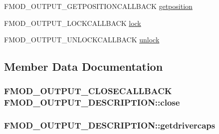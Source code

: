 \begin{DoxyCompactItemize}
\item 
F\-M\-O\-D\-\_\-\-O\-U\-T\-P\-U\-T\-\_\-\-G\-E\-T\-P\-O\-S\-I\-T\-I\-O\-N\-C\-A\-L\-L\-B\-A\-C\-K \hyperlink{struct_f_m_o_d___o_u_t_p_u_t___d_e_s_c_r_i_p_t_i_o_n_ae8b8332e832ea9d12c45a48dd0481e9e}{getposition}
\item 
F\-M\-O\-D\-\_\-\-O\-U\-T\-P\-U\-T\-\_\-\-L\-O\-C\-K\-C\-A\-L\-L\-B\-A\-C\-K \hyperlink{struct_f_m_o_d___o_u_t_p_u_t___d_e_s_c_r_i_p_t_i_o_n_a906c1cdb6636db105538db27b48cc513}{lock}
\item 
F\-M\-O\-D\-\_\-\-O\-U\-T\-P\-U\-T\-\_\-\-U\-N\-L\-O\-C\-K\-C\-A\-L\-L\-B\-A\-C\-K \hyperlink{struct_f_m_o_d___o_u_t_p_u_t___d_e_s_c_r_i_p_t_i_o_n_adeb7eea407c7b5b167d0cd30c6ef4a9f}{unlock}
\end{DoxyCompactItemize}


\subsection{Member Data Documentation}
\hypertarget{struct_f_m_o_d___o_u_t_p_u_t___d_e_s_c_r_i_p_t_i_o_n_a5e0e9b99b7b8011bb248e58ad82b4fa8}{
\subsubsection[{close}]{\setlength{\rightskip}{0pt plus 5cm}F\-M\-O\-D\-\_\-\-O\-U\-T\-P\-U\-T\-\_\-\-C\-L\-O\-S\-E\-C\-A\-L\-L\-B\-A\-C\-K F\-M\-O\-D\-\_\-\-O\-U\-T\-P\-U\-T\-\_\-\-D\-E\-S\-C\-R\-I\-P\-T\-I\-O\-N\-::close}}\label{struct_f_m_o_d___o_u_t_p_u_t___d_e_s_c_r_i_p_t_i_o_n_a5e0e9b99b7b8011bb248e58ad82b4fa8}
\hypertarget{struct_f_m_o_d___o_u_t_p_u_t___d_e_s_c_r_i_p_t_i_o_n_a10a61f364d202bc6d4f298ef41b40fb9}{
\subsubsection[{getdrivercaps}]{ F\-M\-O\-D\-\_\-\-O\-U\-T\-P\-U\-T\-\_\-\-D\-E\-S\-C\-R\-I\-P\-T\-I\-O\-N\-::getdrivercaps}}\label{struct_f_m_o_d___o_u_t_p_u_t___d_e_s_c_r_i_p_t_i_o_n_a10a61f364d202bc6d4f298ef41b40fb9}
